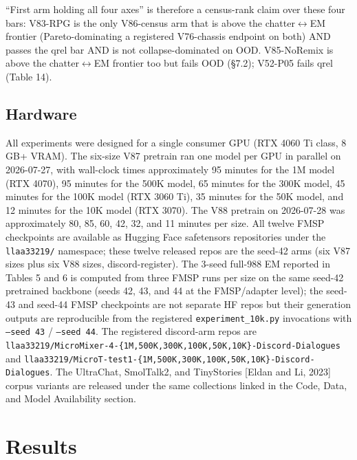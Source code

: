 \documentclass[11pt]{article}
\begin{document}
``First arm holding all four axes'' is therefore a census-rank claim over these four bars: V83-RPG is the only V86-census arm that is above the chatter$\leftrightarrow$EM frontier (Pareto-dominating a registered V76-chassis endpoint on both) AND passes the qrel bar AND is not collapse-dominated on OOD. V85-NoRemix is above the chatter$\leftrightarrow$EM frontier too but fails OOD (\S7.2); V52-P05 fails qrel (Table 14).

\subsection{Hardware}

All experiments were designed for a single consumer GPU (RTX 4060 Ti class, 8 GB+ VRAM). The six-size V87 pretrain ran one model per GPU in parallel on 2026-07-27, with wall-clock times approximately 95 minutes for the 1M model (RTX 4070), 95 minutes for the 500K model, 65 minutes for the 300K model, 45 minutes for the 100K model (RTX 3060 Ti), 35 minutes for the 50K model, and 12 minutes for the 10K model (RTX 3070). The V88 pretrain on 2026-07-28 was approximately 80, 85, 60, 42, 32, and 11 minutes per size. All twelve FMSP checkpoints are available as Hugging Face safetensors repositories under the \texttt{llaa33219/} namespace; these twelve released repos are the seed-42 arms (six V87 sizes plus six V88 sizes, discord-register). The 3-seed full-988 EM reported in Tables 5 and 6 is computed from three FMSP runs per size on the same seed-42 pretrained backbone (seeds 42, 43, and 44 at the FMSP/adapter level); the seed-43 and seed-44 FMSP checkpoints are not separate HF repos but their generation outputs are reproducible from the registered \texttt{experiment\_10k.py} invocations with \texttt{--seed 43} / \texttt{--seed 44}. The registered discord-arm repos are \texttt{llaa33219/MicroMixer-4-\{1M,500K,300K,100K,50K,10K\}-Discord-Dialogues} and \texttt{llaa33219/MicroT-test1-\{1M,500K,300K,100K,50K,10K\}-Discord-Dialogues}. The UltraChat, SmolTalk2, and TinyStories [Eldan and Li, 2023] corpus variants are released under the same collections linked in the Code, Data, and Model Availability section.

\section{Results}
\end{document}
